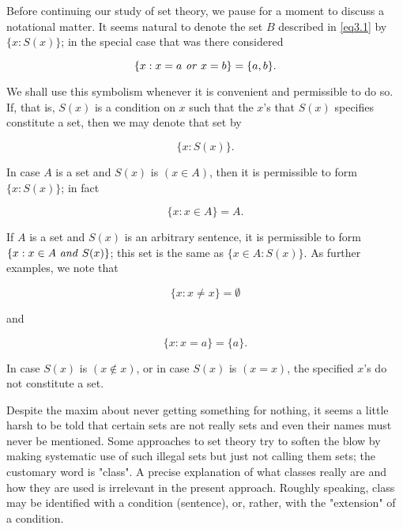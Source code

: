 Before continuing our study of set theory, we pause for a moment to discuss a notational matter. It seems natural to denote the set $B$ described in \eqref{eq3.1} by $\{x: S(x)\}$; in the special case that was there considered

\begin{equation*}
\{ x : x = a \text{ \textit{or} } x = b \} = \{ a,b \}.
\end{equation*}

We shall use this symbolism whenever it is convenient and permissible to do so. If, that is, $S(x)$ is a condition on $x$ such that the $x$'s that $S(x)$ specifies constitute a set, then we may denote that set by 

\begin{equation*}
\{ x : S(x) \}.
\end{equation*}

In case $A$ is a set and $S(x)$ is $(x \in A)$, then it is permissible to form $\{x: S(x)\}$; in fact 

\begin{equation*}
\{ x : x \in A \} = A.
\end{equation*}

If $A$ is a set and $S(x)$ is an arbitrary sentence, it is permissible to form $ \{ x : x \in A \text{ \textit{and} } S(x) \}$; this set is the same as $\{x \in A: S(x) \}$. As further examples, we note that 

\begin{equation*}
\{ x : x \neq x \} = \emptyset
\end{equation*}

and

\begin{equation*}
\{ x : x = a \} = \{ a \}.
\end{equation*}

In case $S(x)$ is $(x \notin x)$, or in case $S(x)$ is $(x = x)$, the specified $x$'s do not constitute a set. 

Despite the maxim about never getting something for nothing, it seems a little harsh to be told that certain sets are not really sets and even their names must never be mentioned. Some approaches to set theory try to soften the blow by making systematic use of such illegal sets but just not calling them sets; the customary word is "class". A precise explanation of what classes really are and how they are used is irrelevant in the present approach. Roughly speaking, class may be identified with a condition (sentence), or, rather, with the "extension" of a condition.